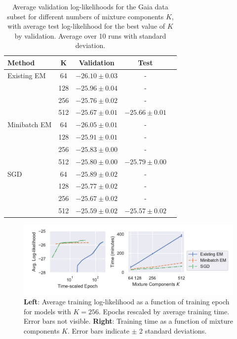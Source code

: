 \begin{table}{}
  \caption{Average validation log-likelihoods for the Gaia data subset for different numbers of mixture components $K$, with average test log-likelihood for the best value of $K$ by validation. Average over 10 runs with standard deviation.}
  \label{results-table}
  \centering
  \begin{tabular}{lcccc}
      \toprule
      Method     & K &  Validation     & Test\\
      \midrule
      Existing EM & 64 & $-26.10 \pm 0.03$ & - \\
      \citet{bovyExtremeDeconvolutionInferring2011} & 128 & $-25.96 \pm 0.04$ & - \\
       & 256 & $-25.76 \pm 0.02$ & - \\
       & 512 & $-25.67 \pm 0.01$ & $-25.66 \pm 0.01$ \\
      \midrule
      Minibatch EM & 64 & $-26.05 \pm 0.01$ & - \\
       & 128 & $-25.91 \pm 0.01$ & - \\
       & 256 & $-25.83 \pm 0.00$ & - \\
       & 512 & $-25.80 \pm 0.00$ & $-25.79 \pm 0.00$ \\
      \midrule
      SGD & 64 & $-25.89 \pm 0.02$ & - \\
       & 128 & $-25.77 \pm 0.02$ & - \\
       & 256 & $-25.67 \pm 0.02$ & - \\
       & 512 & $-25.59 \pm 0.02$ & $-25.57 \pm 0.02$ \\
      \bottomrule
  \end{tabular}
\end{table}

\begin{figure}
  \centering
  \includegraphics[width=\textwidth]{figures/learning.pdf}
  \caption{\textbf{Left}: Average training log-likelihood as a function of training epoch for models with $K=256$. Epochs rescaled by average training time. Error bars not visible. \textbf{Right}: Training time as a function of mixture components $K$. Error bars indicate $\pm$ 2 standard deviations.}
  \label{fig:training}
\end{figure}

